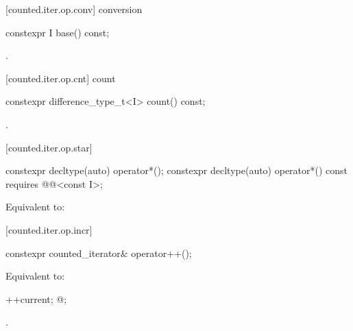 [counted.iter.op.conv]{ conversion}

%
%
\begin{itemdecl}
constexpr I base() const;
\end{itemdecl}

\begin{itemdescr}
\pnum
\returns {}.
\end{itemdescr}

[counted.iter.op.cnt]{ count}

%
%
\begin{itemdecl}
constexpr difference_type_t<I> count() const;
\end{itemdecl}

\begin{itemdescr}
\pnum
\returns {}.
\end{itemdescr}

[counted.iter.op.star]{}

%
%
\begin{itemdecl}
constexpr decltype(auto) operator*();
constexpr decltype(auto) operator*() const
  requires @@<const I>;
\end{itemdecl}

\begin{itemdescr}
\pnum
\effects Equivalent to:
\end{itemdescr}

[counted.iter.op.incr]{}

%
%
\begin{itemdecl}
constexpr counted_iterator& operator++();
\end{itemdecl}

\begin{itemdescr}
\pnum
\requires {}

\pnum
\effects Equivalent to:
\begin{codeblock}
++current;
@\dcr@cnt;
\end{codeblock}

\pnum
\returns {}.
\end{itemdescr}

